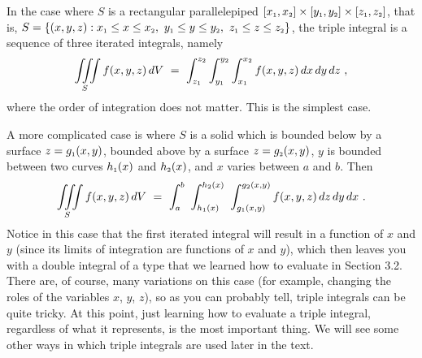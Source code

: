 In the case where $S$ is a rectangular parallelepiped
$\lbrack x_{\scriptscriptstyle 1},x_{\scriptscriptstyle 2} \rbrack \times \lbrack y_{\scriptscriptstyle 1},y_{\scriptscriptstyle 2} \rbrack \times \lbrack
z_{\scriptscriptstyle 1},z_{\scriptscriptstyle 2} \rbrack$, that is, $S = \lbrace (x,y,z): x_{\scriptscriptstyle 1} \le x \le x_{\scriptscriptstyle 2},~
y_{\scriptscriptstyle 1} \le y \le y_{\scriptscriptstyle 2},~z_{\scriptscriptstyle 1} \le z \le z_{\scriptscriptstyle 2} \rbrace$, the triple integral is a sequence
of three iterated integrals, namely
\begin{equation}
 \iiint\limits_{S} f(x,y,z)\,dV ~=~
  \int_{z_{\scriptscriptstyle 1}}^{z_{\scriptscriptstyle 2}} \int_{y_{\scriptscriptstyle 1}}^{y_{\scriptscriptstyle 2}} \int_{x_{\scriptscriptstyle 1}}^{x_{\scriptscriptstyle 2}} f(x,y,z)\,
  dx\,dy\,dz ~,
\end{equation}
where the order of integration does not matter. This is the simplest case.

A more complicated case is where $S$ is a solid which is bounded below by a surface $z=g_{\scriptscriptstyle 1}(x,y)$, bounded above
by a surface $z=g_{\scriptscriptstyle 2}(x,y)$, $y$ is bounded between two curves $h_{\scriptscriptstyle 1}(x)$ and $h_{\scriptscriptstyle 2}(x)$, and $x$
varies between $a$ and $b$. Then
\begin{equation}\label{eqn:vsolid}
 \iiint\limits_{S} f(x,y,z)\,dV 
 ~=~
 \int_{a}^{b}
 \,\, 
 \int_{h_{\scriptscriptstyle 1}(x)}^{h_{\scriptscriptstyle 2}(x)}
 \,\,
 \int_{g_{\scriptscriptstyle 1}(x,y)}^{g_{\scriptscriptstyle 2}(x,y)} f(x,y,z)\,
  dz\,dy\,dx ~.
\end{equation}
Notice in this case that the first iterated integral will result in a function of $x$ and $y$ (since its limits
of integration are functions of $x$ and $y$), which then leaves you with a double integral of a type that we learned
how to evaluate in Section 3.2. There are, of course, many variations on this case (for example, changing the roles of
the variables $x$, $y$, $z$), so as you can probably tell, triple integrals can be quite tricky. At this point, just
learning how to evaluate a triple integral, regardless of what it represents, is the most important thing. We will see
some other ways in which triple integrals are used later in the text.

